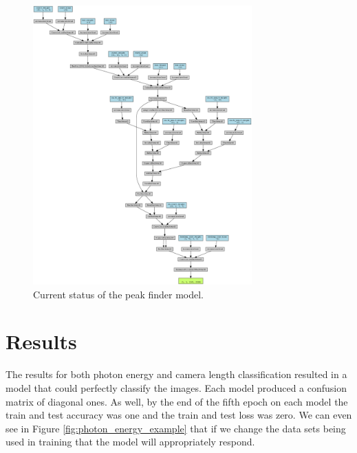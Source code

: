 \documentclass[12pt]{article}
\begin{document}
\begin{figure}[H]
    \centering
    \includegraphics[width=0.75\textwidth]{models/first_peak_finder_model.png.png}
    \caption{Current status of the peak finder model.}
    \label{fig:peak_finder}
\end{figure}

\section{Results}

The results for both photon energy and camera length classification resulted in a model that could perfectly classify the images. Each model produced a confusion matrix of diagonal ones. As well, by the end of the fifth epoch on each model the train and test accuracy was one and the train and test loss was zero. We can even see in Figure \ref{fig:photon_energy_example} that if we change the data sets being used in training that the model will appropriately respond.\\
\end{document}

